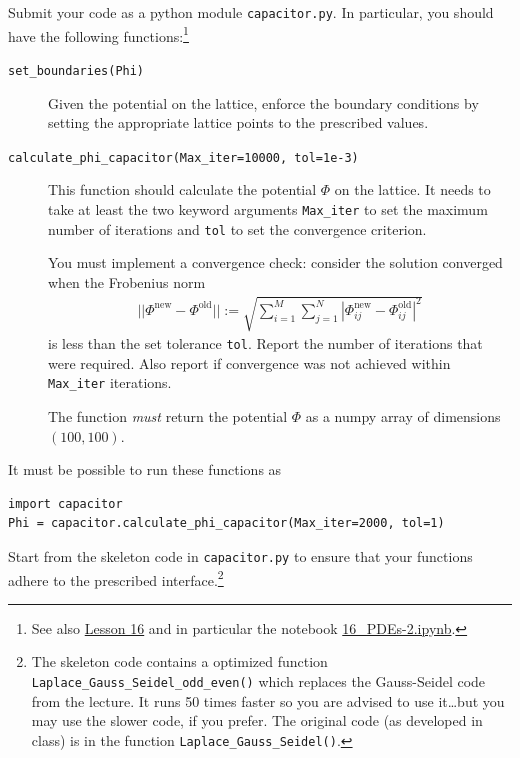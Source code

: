 \documentclass[letterpaper]{scrartcl}
\begin{document}
Submit your code as a python module \texttt{capacitor.py}. In
particular, you should have the following functions:\footnote{See also
  \href{https://asu-compmethodsphysics-phy494.github.io/ASU-PHY494//2019/04/11/16_PDEs/}{Lesson
    16} and in particular the notebook
  \href{https://nbviewer.jupyter.org/github/ASU-CompMethodsPhysics-PHY494/PHY494-resources/blob/master/16_PDEs/16_PDEs-2.ipynb}{16\_PDEs-2.ipynb}.}
\begin{description}
\item[\texttt{set\_boundaries(Phi)}] Given the potential on the
  lattice, enforce the boundary conditions by setting the appropriate
  lattice points to the prescribed values.
\item[\texttt{calculate\_phi\_capacitor(Max\_iter=10000, tol=1e-3)}] This
  function should calculate the potential $\Phi$ on the lattice. It
  needs to take at least the two keyword arguments \texttt{Max\_iter}
  to set the maximum number of iterations and \texttt{tol} to set the
  convergence criterion.

  You must implement a convergence check: consider the solution
  converged when the Frobenius norm
  \begin{gather}
    ||\Phi^{\text{new}} - \Phi^{\text{old}}|| :=
    \sqrt{\sum_{i=1}^{M}\sum_{j=1}^{N} \left|\Phi^{\text{new}}_{ij} -
        \Phi^{\text{old}}_{ij}\right|^{2}}
    \label{eq:Frobeniusnorm}    
  \end{gather}
  is less than the set tolerance \texttt{tol}. Report the
  number of iterations that were required. Also report if convergence
  was not achieved within \texttt{Max\_iter} iterations.

  The function \emph{must} return the potential $\Phi$ as a numpy
  array of dimensions $(100, 100)$.
\end{description}
It must be possible to run these functions as
\begin{verbatim}
import capacitor
Phi = capacitor.calculate_phi_capacitor(Max_iter=2000, tol=1)
\end{verbatim}

Start from the skeleton code in \texttt{capacitor.py} to ensure that
your functions adhere to the prescribed interface.\footnote{The
  skeleton code contains a optimized function
  \texttt{Laplace\_Gauss\_Seidel\_odd\_even()} which replaces the
  Gauss-Seidel code from the lecture. It runs 50 times faster so you
  are advised to use it\dots but you may use the slower code, if you
  prefer. The original code (as developed in class) is in the function
  \texttt{Laplace\_Gauss\_Seidel()}.}
\end{document}
